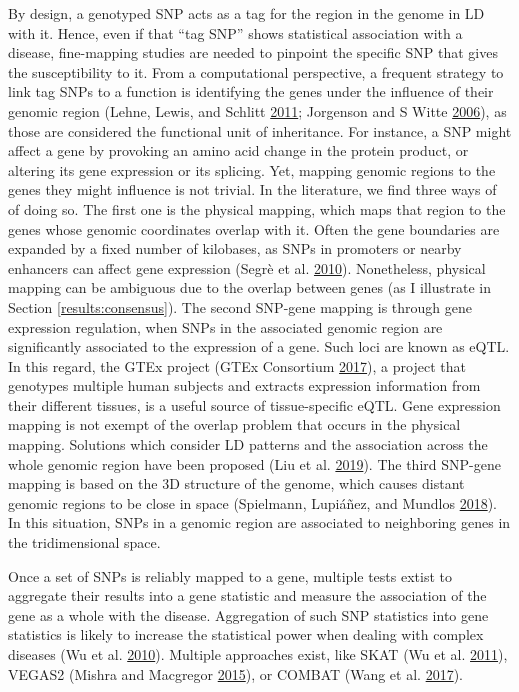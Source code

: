 \documentclass[
  11pt,
]{env/yjiao}
\begin{document}
By design, a genotyped SNP acts as a tag for the region in the genome in LD with it. Hence, even if that ``tag SNP'' shows statistical association with a disease, fine-mapping studies are needed to pinpoint the specific SNP that gives the susceptibility to it. From a computational perspective, a frequent strategy to link tag SNPs to a function is identifying the genes under the influence of their genomic region (Lehne, Lewis, and Schlitt \protect\hyperlink{ref-lehne2011snps}{2011}; Jorgenson and S Witte \protect\hyperlink{ref-Jorgenson}{2006}), as those are considered the functional unit of inheritance. For instance, a SNP might affect a gene by provoking an amino acid change in the protein product, or altering its gene expression or its splicing. Yet, mapping genomic regions to the genes they might influence is not trivial. In the literature, we find three ways of of doing so. The first one is the physical mapping, which maps that region to the genes whose genomic coordinates overlap with it. Often the gene boundaries are expanded by a fixed number of kilobases, as SNPs in promoters or nearby enhancers can affect gene expression (Segrè et al. \protect\hyperlink{ref-segre_common_2010}{2010}). Nonetheless, physical mapping can be ambiguous due to the overlap between genes (as I illustrate in Section \ref{results:consensus}). The second SNP-gene mapping is through gene expression regulation, when SNPs in the associated genomic region are significantly associated to the expression of a gene. Such loci are known as eQTL. In this regard, the GTEx project (GTEx Consortium \protect\hyperlink{ref-gtex_consortium_genetic_2017}{2017}), a project that genotypes multiple human subjects and extracts expression information from their different tissues, is a useful source of tissue-specific eQTL. Gene expression mapping is not exempt of the overlap problem that occurs in the physical mapping. Solutions which consider LD patterns and the association across the whole genomic region have been proposed (Liu et al. \protect\hyperlink{ref-liu_abundant_2019}{2019}). The third SNP-gene mapping is based on the 3D structure of the genome, which causes distant genomic regions to be close in space (Spielmann, Lupiáñez, and Mundlos \protect\hyperlink{ref-spielmann_structural_2018}{2018}). In this situation, SNPs in a genomic region are associated to neighboring genes in the tridimensional space.

Once a set of SNPs is reliably mapped to a gene, multiple tests extist to aggregate their results into a gene statistic and measure the association of the gene as a whole with the disease. Aggregation of such SNP statistics into gene statistics is likely to increase the statistical power when dealing with complex diseases (Wu et al. \protect\hyperlink{ref-wu2010novel}{2010}). Multiple approaches exist, like SKAT (Wu et al. \protect\hyperlink{ref-wu_rare-variant_2011}{2011}), VEGAS2 (Mishra and Macgregor \protect\hyperlink{ref-mishra_vegas2:_2015}{2015}), or COMBAT (Wang et al. \protect\hyperlink{ref-wang_combat:_2017}{2017}).
\end{document}
